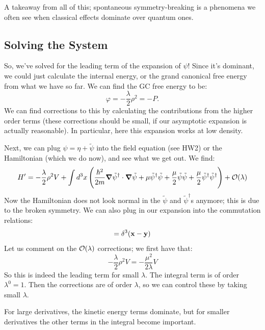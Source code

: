 A takeaway from all of this; spontaneous symmetry-breaking is a phenomena we often see when classical effects dominate over quantum ones.

\subsection{Solving the System}
So, we've solved for the leading term of the expansion of $\psi$! Since it's dominant, we could just calculate the internal energy, or the grand canonical free energy from what we have so far. We can find the GC free energy to be:
\begin{equation}
    \varphi = -\frac{\lambda}{2}\rho^2 = -P.
\end{equation}
We can find corrections to this by calculating the contributions from the higher order terms (these corrections should be small, if our asymptotic expansion is actually reasonable). In particular, here this expansion works at low density.

Next, we can plug $\psi = \eta + \tilde{\psi}$ into the field equation (see HW2) or the Hamiltonian (which we do now), and see what we get out. We find:
\begin{equation}
    H' = -\frac{\lambda}{2}\rho^2 V + \int d^3x \left(\frac{\hbar^2}{2m}\nabla \tilde{\psi}^\dag \cdot \nabla \tilde{\psi} + \mu \tilde{\psi}^\dag \tilde{\psi} + \frac{\mu}{2} \tilde{\psi} \tilde{\psi} + \frac{\mu}{2}\tilde{\psi}^\dag \tilde{\psi}^\dag\right) + \O(\lambda)
\end{equation}
Now the Hamiltonian does not look normal in the $\tilde{\psi}$ and $\tilde{\psi}^\dag$s anymore; this is due to the broken symmetry. We can also plug in our expansion into the commutation relations:
\begin{equation}
    [\tilde{\psi}(\v{x}, t), \tilde{\psi}^\dag(\v{y}, t)] = \delta^3(\v{x} - \v{y})
\end{equation}
Let us comment on the $\mathcal{O}(\lambda)$ corrections; we first have that:
\begin{equation}
    -\frac{\lambda}{2}\rho^2V = -\frac{\mu^2}{2\lambda}V
\end{equation}
So this is indeed the leading term for small $\lambda$. The integral term is of order $\lambda^0 = 1$. Then the corrections are of order $\lambda$, so we can control these by taking small $\lambda$.

For large derivatives, the kinetic energy terms dominate, but for smaller derivatives the other terms in the integral become important. 

